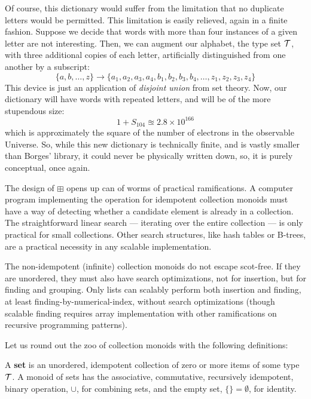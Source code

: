 Of course, this dictionary would suffer from the limitation that no duplicate letters would be permitted. This limitation is easily relieved, again in a finite fashion. Suppose we decide that words with more than four instances of a given letter are not interesting. Then, we can augment our alphabet, the type set $\mathcal{T}$, with three additional copies of each letter, artificially distinguished from one another by a subscript:
\[
 \{a,b,\ldots,z\}\rightarrow\{a_1,a_2,a_3,a_4,
 b_1,b_2,b_3,b_4,
 \ldots,z_1,z_2,z_3,z_4\}
\]
This device is just an application of \emph{disjoint union} from set theory. Now, our dictionary will have words with repeated letters, and will be of the more stupendous size:
\[
  1+S_{104}\approxeq 2.8\times 10^{166}
\]
which is approximately the square of the number of electrons in the observable Universe. So, while this new dictionary is technically finite, and is vastly smaller than Borges' library, it could never be physically written down, so, it is purely conceptual, once again.


The design of $\boxplus$ opens up can of worms of practical ramifications. A computer program implementing the operation for idempotent collection monoids must have a way of detecting whether a candidate element is already in a collection. The straightforward linear search --- iterating over the entire collection --- is only practical for small collections. Other search structures, like hash tables or B-trees, are a practical necessity in any scalable implementation.


The non-idempotent (infinite) collection monoids do not escape scot-free. If they are unordered, they must also have search optimizations, not for insertion, but for finding and grouping. Only lists can scalably perform both insertion and finding, at least finding-by-numerical-index, without search optimizations (though scalable finding requires array implementation with other ramifications on recursive programming patterns).


Let us round out the zoo of collection monoids with the following definitions:


\begin{definition}
  A \textbf{set} is an unordered, idempotent collection of zero or more items of some type $\mathcal{T}$. A monoid of sets has the associative, commutative, recursively idempotent, binary operation, $\cup$, for combining sets, and the empty set, $\{\}=\emptyset$, for identity.
\end{definition}


